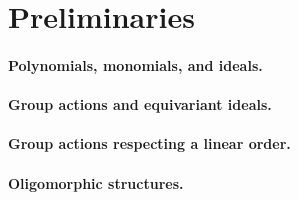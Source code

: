 \section{Preliminaries}
\label{sec:preliminaries}

\paragraph{Polynomials, monomials, and ideals.}

\paragraph{Group actions and equivariant ideals.}

\paragraph{Group actions respecting a linear order.}

\paragraph{Oligomorphic structures.}


